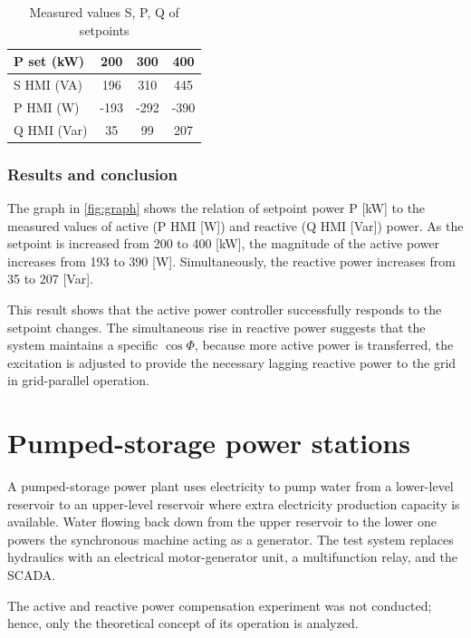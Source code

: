 \documentclass{article}
\begin{document}
\begin{table}[ht!]
    \centering
    \caption{Measured values S, P, Q of setpoints}
    \label{tab:power}
    \begin{tabular}{lccc}
        \toprule
        \textbf{P set (kW)} & \textbf{200} & \textbf{300} & \textbf{400}\\
        \midrule
        S HMI (VA) & 196 & 310 & 445\\
        P HMI (W) & -193 & -292 & -390\\
        Q HMI (Var) & 35 & 99 & 207\\
        \bottomrule
    \end{tabular}
\end{table}

\subsubsection{Results and conclusion}
The graph in \autoref{fig:graph} shows the relation of setpoint power P [kW] to the
measured values of active (P HMI [W]) and reactive (Q HMI [Var]) power. As the setpoint
is increased from 200 to 400 [kW], the magnitude of the active power increases from 193
to 390 [W]. Simultaneously, the reactive power increases from 35 to 207 [Var].

This result shows that the active power controller successfully responds to the setpoint
changes. The simultaneous rise in reactive power suggests that the system maintains a
specific $\cos\Phi$, because more active power is transferred, the excitation is adjusted
to provide the necessary lagging reactive power to the grid in grid-parallel operation. 

\newpage

\section{Pumped-storage power stations}
A pumped-storage power plant uses electricity to pump water from a lower-level
reservoir to an upper-level reservoir where extra electricity production capacity is
available. Water flowing back down from the upper reservoir to the lower one powers
the synchronous machine acting as a generator. The test system replaces hydraulics with
an electrical motor-generator unit, a multifunction relay, and the SCADA.

The active and reactive power compensation experiment was not conducted; hence, only the
theoretical concept of its operation is analyzed.
\end{document}
